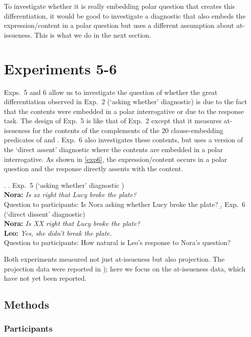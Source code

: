 \documentclass[times,linguex,xcolor]{glossa}
\begin{document}
   To investigate whether it is really embedding polar question that creates this differentiation, it would be good to investigate a diagnostic that also embeds the expression/content in a polar question but uses a different assumption about at-issueness. This is what we do in the next section.
        
\section{Experiments 5-6 \label{sec:3_more-experiments}}

Exps.~5 and 6 allow us to investigate the question of whether the great differentiation observed in Exp.~2 (`asking whether' diagnostic) is due to the fact that the contents were embedded in a polar interrogative or due to the response task. The design of Exp.~5 is like that of Exp.~2 except that it measures at-issueness for the contents of the complements of the 20 clause-embedding predicates of \citealt{tonhauser_how_2018} and \citealt{degen-tonhauser-glossa}. Exp.~6 also investigates these contents, but uses a version of the  `direct assent' diagnostic where the contents are embedded in a polar interrogative. As shown in \ref{exp6}, the expression/content occurs in a polar question and the response directly assents with the content. 

  \ex.
  \a.\label{exp5} Exp.~5 (`asking whether' diagnostic )
  \\ {\bf Nora:} \emph{Is xx right that Lucy broke the plate?}
  \\ Question to participants: Is Nora asking whether Lucy broke the plate?
  \b.\label{exp6} Exp.~6 (`direct dissent' diagnostic)
  \\ {\bf Nora:} \emph{Is XX right that Lucy broke the plate?}
  \\ {\bf Leo:} \emph{Yes, she didn't break the plate.}
  \\ Question to participants: How natural is Leo's response to Nora's question?
  
Both experiments measured not just at-issueness but also projection. The projection data were reported in \citealt{hofmann-etal2024}); here we focus on the at-issueness data, which have not yet been reported.

  \subsection{Methods}
  
  \subsubsection{Participants}
\end{document}
